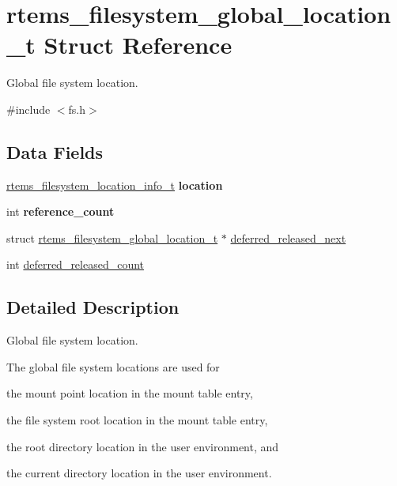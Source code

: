 \hypertarget{structrtems__filesystem__global__location__t}{}\section{rtems\+\_\+filesystem\+\_\+global\+\_\+location\+\_\+t Struct Reference}
\label{structrtems__filesystem__global__location__t}


Global file system location.  




{\ttfamily \#include $<$fs.\+h$>$}

\subsection*{Data Fields}
\begin{DoxyCompactItemize}
\item 
\mbox{\label{structrtems__filesystem__global__location__t_a4ec431a2941e161198c566fb57ddac08}} 
\mbox{\hyperlink{group__LibIO_ga3252b3d31ee3c49ffff0b7604a676864}{rtems\+\_\+filesystem\+\_\+location\+\_\+info\+\_\+t}} {\bfseries location}
\item 
\mbox{\label{structrtems__filesystem__global__location__t_a886f0a240b776678d328a4b343324159}} 
int {\bfseries reference\+\_\+count}
\item 
struct \mbox{\hyperlink{structrtems__filesystem__global__location__t}{rtems\+\_\+filesystem\+\_\+global\+\_\+location\+\_\+t}} $\ast$ \mbox{\hyperlink{structrtems__filesystem__global__location__t_adc7c86bee7c1adeafb587459ce6afbd5}{deferred\+\_\+released\+\_\+next}}
\item 
int \mbox{\hyperlink{structrtems__filesystem__global__location__t_adee2683dd338a69847b0a5bd3ee12882}{deferred\+\_\+released\+\_\+count}}
\end{DoxyCompactItemize}


\subsection{Detailed Description}
Global file system location. 

The global file system locations are used for
\begin{DoxyItemize}
\item the mount point location in the mount table entry,
\item the file system root location in the mount table entry,
\item the root directory location in the user environment, and
\item the current directory location in the user environment.
\end{DoxyItemize}

